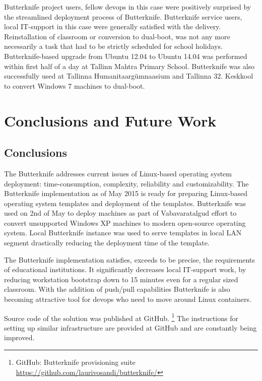 \documentclass[a4paper,11pt]{kth-mag}
\begin{document}
Butterknife project users,
fellow devops in this case
were positively surprised by the
streamlined deployment process of Butterknife.
Butterknife service users,
local IT-support in this case
were generally satisfied with the delivery.
Reinstallation of classroom or conversion to dual-boot,
was not any more necessarily a task that had to
be strictly scheduled for school holidays.
Butterknife-based upgrade from Ubuntu 12.04 to
Ubuntu 14.04 was performed within first
half of a day at Tallinn Mahtra Primary School.
Butterknife was also successfully used at
Tallinna Humanitaargümnaasium and
Tallinna 32. Keskkool
to convert Windows 7 machines to dual-boot.



%
%
%
%

\chapter{Conclusions and Future Work}
\label{chap:conc}

\section{Conclusions}

The Butterknife addresses current issues
of Linux-based operating system deployment:
time-consumption, complexity, reliability
and customizability.
The Butterknife implementation as of May 2015
is ready for preparing Linux-based operating system templates
and deployment of the templates.
Butterknife was used on 2nd of May to deploy
machines as part of Vabavaratalgud \cite{vabavaratalgud}
effort to convert unsupported Windows XP machines
to modern open-source operating system.
Local Butterknife instance was used to serve templates
in local LAN segment drastically reducing the deployment time
of the template.


The Butterknife implementation satisfies, exceeds to be precise,
the requirements of educational institutions.
It significantly decreases local IT-support work,
by reducing workstation bootstrap down to 15 minutes even for
a regular sized classroom.
With the addition of push/pull capabilities
Butterknife is also becoming attractive tool
for devops who need to move around Linux containers.

Source code of the solution was published at GitHub.
\footnote{GitHub: Butterknife provisioning suite \url{https://github.com/laurivosandi/butterknife/}}
The instructions for setting up similar infrastructure
are provided at GitHub and are constantly being improved.
\end{document}
